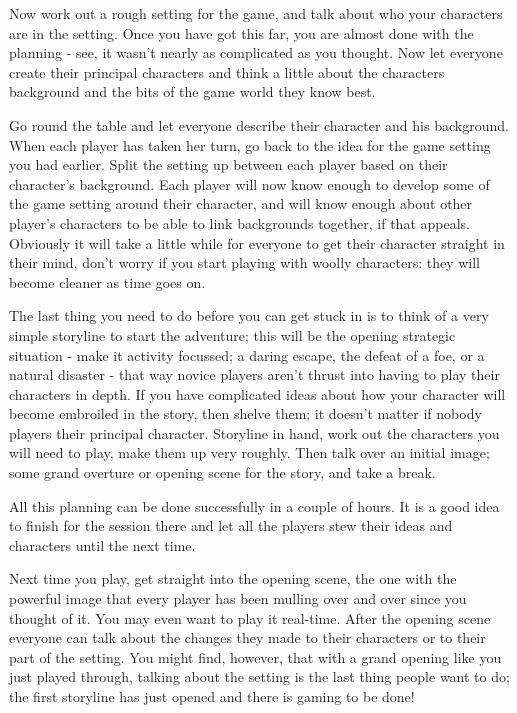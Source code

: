 \documentclass[twoside]{book}
\begin{document}
Now work out a rough setting for the game, and talk about who your
characters are in the setting. Once you have got this far, you are
almost done with the planning - see, it wasn't nearly as complicated
as you thought. Now let everyone create their principal characters and
think a little about the characters background and the bits of the
game world they know best.

Go round the table and let everyone describe their character and his
background. When each player has taken her turn, go back to the idea
for the game setting you had earlier. Split the setting up between
each player based on their character's background. Each player will
now know enough to develop some of the game setting around their
character, and will know enough about other player's characters to be
able to link backgrounds together, if that appeals. Obviously it will
take a little while for everyone to get their character straight in
their mind, don't worry if you start playing with woolly characters:
they will become cleaner as time goes on.

The last thing you need to do before you can get stuck in is to think
of a very simple storyline to start the adventure; this will be the
opening strategic situation - make it activity focussed; a daring
escape, the defeat of a foe, or a natural disaster - that way novice
players aren't thrust into having to play their characters in
depth. If you have complicated ideas about how your character will
become embroiled in the story, then shelve them; it doesn't matter if
nobody players their principal character. Storyline in hand, work out
the characters you will need to play, make them up very roughly. Then
talk over an initial image; some grand overture or opening scene for
the story, and take a break.

All this planning can be done successfully in a couple of hours. It is
a good idea to finish for the session there and let all the players
stew their ideas and characters until the next time.

Next time you play, get straight into the opening scene, the one with
the powerful image that every player has been mulling over and over
since you thought of it. You may even want to play it real-time. After
the opening scene everyone can talk about the changes they made to
their characters or to their part of the setting. You might find,
however, that with a grand opening like you just played through,
talking about the setting is the last thing people want to do; the
first storyline has just opened and there is gaming to be done!
\end{document}
